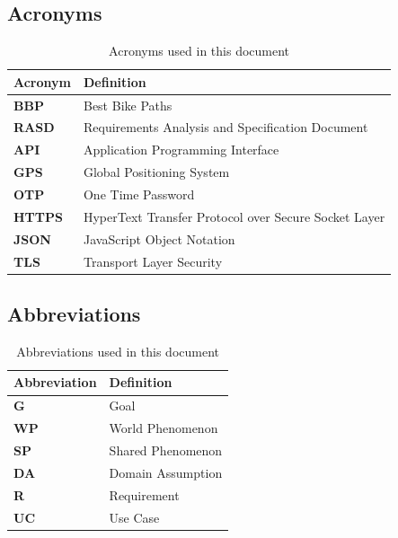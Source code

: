 \subsection{Acronyms}
\begin{table}[H]
    \sf
    \small
    \centering
    \renewcommand{\arraystretch}{1.5}
    \begin{tabularx}{\textwidth}{|l|X|}
        \hline
        \rowcolor{lightgray} \textbf{Acronym} & \textbf{Definition}\\
        \hline
        \textbf{BBP} & Best Bike Paths \\
        \textbf{RASD} & Requirements Analysis and Specification Document \\
        \textbf{API} & Application Programming Interface \\
        \textbf{GPS} & Global Positioning System \\
        \textbf{OTP} & One Time Password \\
        \textbf{HTTPS} & HyperText Transfer Protocol over Secure Socket Layer \\
        \textbf{JSON} & JavaScript Object Notation \\
        \textbf{TLS} & Transport Layer Security \\
        \hline
    \end{tabularx}
    \caption{Acronyms used in this document}
\end{table}

\subsection{Abbreviations}
\begin{table}[H]
    \sf
    \small
    \centering
    \renewcommand{\arraystretch}{1.5}
    \begin{tabularx}{\textwidth}{|l|X|}
        \hline
        \rowcolor{lightgray} \textbf{Abbreviation} & \textbf{Definition}\\
        \hline
        \textbf{G} & Goal \\
        \textbf{WP} & World Phenomenon \\
        \textbf{SP} & Shared Phenomenon \\
        \textbf{DA} & Domain Assumption \\
        \textbf{R} & Requirement \\
        \textbf{UC} & Use Case \\
        \hline
    \end{tabularx}
    \caption{Abbreviations used in this document}
\end{table}

